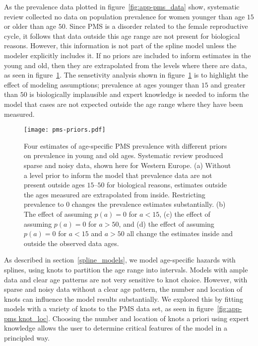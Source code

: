 As the prevalence data plotted in figure~\ref{fig:app-pms_data} show,
systematic review collected no data on population prevalence for women
younger than age $15$ or older than age $50$.  Since PMS is a disorder
related to the female reproductive cycle, it follows that data outside
this age range are not present for biological reasons.  However, this
information is not part of the spline model unless the modeler
explicitly includes it.  If no priors are included to inform estimates
in the young and old, then they are extrapolated from the levels where
there are data, as seen in figure~\ref{fig:app-pms prios_on_level}.  The 
sensetivity analysis shown in figure~\ref{fig:app-pms prios_on_level} is 
to highlight the effect of modeling assumptions; prevalence at ages 
younger than $15$ and greater than $50$ is biologically implausible and 
expert knowledge is needed to inform the model that cases are not
expected outside the age range where they have been measured.

    \begin{figure}
        \begin{center}
            \texttt{[image: pms-priors.pdf]}
        \end{center}
        \caption[Four estimates of age-specific PMS prevalence with
          different priors on prevalence in young and old ages.]{Four
          estimates of age-specific PMS prevalence with different
          priors on prevalence in young and old ages.  Systematic
          review produced sparse and noisy data, shown here for
          Western Europe.  (a) Without a level prior to inform the
          model that prevalence data are not present outside
          ages $15$--$50$ for biological reasons, estimates outside the
          ages measured are extrapolated from inside.  Restricting
          prevalence to $0$ changes the prevalence estimates
          substantially. (b) The effect of assuming $p(a) = 0$ for
          $a<15$, (c) the effect of assuming $p(a) = 0$ for $a>50$,
          and (d) the effect of assuming $p(a) = 0$ for $a<15$ and
          $a>50$ all change the estimates inside and outside the
          observed data ages.}
        \label{fig:app-pms prios_on_level}
    \end{figure}


As described in
section~\ref{spline_models}, we model
age-specific hazards with splines, using knots to partition the age
range into intervals.  Models with ample data and clear age patterns
are not very sensitive to knot choice.  However, with sparse and
noisy data without a clear age pattern, the number and location of
knots can influence the model results substantially.  We explored this
by fitting models with a variety of knots to the PMS data set, as seen
in figure~\ref{fig:app-pms knot_loc}.  Choosing the number and
location of knots a priori using expert knowledge allows the user to
determine critical features of the model in a principled way.

